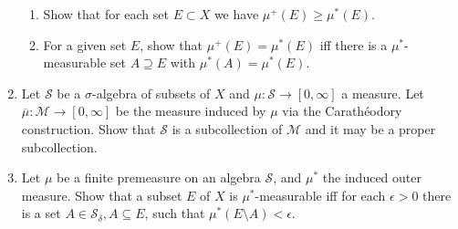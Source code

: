 \begin{enumerate}
	\begin{enumerate}[label=(\roman*),align=left]  
		\item Show that for each set $E\subset X$ we have $\mu^+(E)\ge\mu^*(E)$.
		\item For a given set $E$, show that $\mu^+(E)=\mu^*(E)$ iff there is a $\mu^*$-measurable set $A\supseteq E$ with $\mu^*(A)=\mu^*(E)$.
	\end{enumerate}
	\item Let $\mathcal{S}$ be a $\sigma$-algebra of subsets of $X$ and $\mu:\mathcal{S}\to[0,\infty]$ a measure.
	Let $\overline\mu:\mathcal{M}\to[0,\infty]$ be the measure induced by $\mu$ via the Carath\'eodory construction.
	Show that $\mathcal{S}$ is a subcollection of $\mathcal{M}$ and it may be a proper subcollection.
	\item Let $\mu$ be a finite premeasure on an algebra $\mathcal{S}$, and $\mu^*$ the induced outer measure.
	Show that a subset $E$ of $X$ is $\mu^*$-measurable iff for each $\epsilon>0$ there is a set $A\in\mathcal{S}_\delta,A\subseteq E$, such that $\mu^*(E\setminus A)<\epsilon$.
\end{enumerate}
